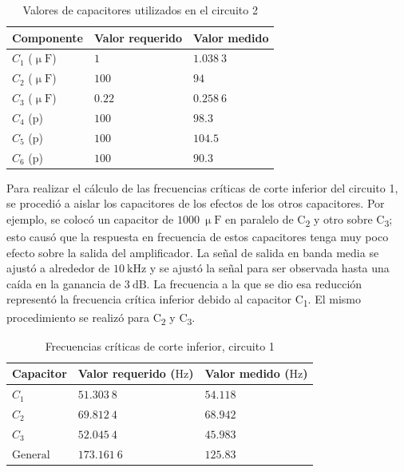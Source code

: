 \documentclass[journal]{IEEEtran}
\begin{document}
\begin{table}[H]
        \centering
        \renewcommand{\arraystretch}{1.5}
        \caption{Valores de capacitores utilizados en el circuito 2}
        \begin{tabular}{ >{\centering\arraybackslash}m{2.5cm} >{\centering\arraybackslash}m{2.5cm} >{\centering\arraybackslash}m{2.5cm} }
                \hline
            Componente & Valor requerido & Valor medido\\ 
            \hline
            \centering
            $C_1$ ($\upmu\mathrm{F}$) & $1$  & $1.038~3$  \\ 
            $C_2$ ($\upmu\mathrm{F}$) & $100$  & $94$ \\
            $C_3$ ($\upmu\mathrm{F}$) & $0.22$  & $0.258~6$ \\
            $C_4$ ($\mathrm{p}$) & $100$ & $98.3$ \\
            $C_5$ ($\mathrm{p}$) & $100$ & $104.5$ \\
            $C_6$ ($\mathrm{p}$) & $100$ & $90.3$ \\
            \hline
        \end{tabular}
        \label{tabla3}
    \end{table}   

Para realizar el cálculo de las frecuencias críticas de corte inferior del circuito 1, se procedió a aislar los capacitores de los efectos de los otros capacitores. Por ejemplo, se colocó un capacitor de $1000~\upmu\mathrm{F}$ en paralelo de C\textsubscript{2} y otro sobre C\textsubscript{3}; esto causó que la respuesta en frecuencia de estos capacitores tenga muy poco efecto sobre la salida del amplificador.
La señal de salida en banda media se ajustó a alrededor de $10~\mathrm{kHz}$ y se ajustó la
señal para ser observada hasta una caída en la ganancia de $3~\mathrm{dB}$. La frecuencia a la que se dio esa reducción representó la frecuencia crítica inferior debido al capacitor C\textsubscript{1}. El mismo procedimiento
se realizó para C\textsubscript{2} y C\textsubscript{3}.

\begin{table}[H]
        \centering
        \renewcommand{\arraystretch}{1.5}
        \caption{Frecuencias críticas de corte inferior, circuito 1}
        \begin{tabular}{ >{\centering\arraybackslash}m{2.5cm} >{\centering\arraybackslash}m{2.5cm} >{\centering\arraybackslash}m{2.5cm} }
                \hline
            Capacitor & Valor requerido ($\mathrm{Hz}$) & Valor medido ($\mathrm{Hz}$)\\ 
            \hline
            \centering
            $C_1$ & $51.303~8$  & $54.118$  \\ 
            $C_2$ & $69.812~4$  & $68.942$ \\
            $C_3$ & $52.045~4$  & $45.983$ \\
            $\mathrm{General}$ & $173.161~6$  & $125.83$ \\
            \hline
        \end{tabular}
        \label{tabla4}
    \end{table}    
\end{document}
